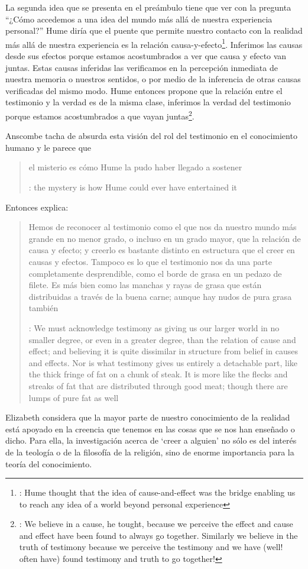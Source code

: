 La segunda idea que se presenta en el preámbulo tiene que ver con la pregunta \enquote{¿Cómo accedemos a una idea del mundo más allá de nuestra experiencia personal?} Hume diría que el puente que permite nuestro contacto con la realidad más allá de nuestra experiencia es la relación causa-y-efecto\footnote{\cite[Cf.~][3]{anscombe2008faith:tobelieve}: Hume thought that the idea of cause-and-effect was the bridge enabling us to reach any idea of a world beyond personal experience}. Inferimos las causas desde sus efectos porque estamos acostumbrados a ver que causa y efecto van juntas. Estas causas inferidas las verificamos en la percepción inmediata de nuestra memoria o nuestros sentidos, o por medio de la inferencia de otras causas verificadas del mismo modo\autocite[Cf.~][88]{anscombe1981parmenides:humeandjulius}. Hume entonces propone que la relación entre el testimonio y la verdad es de la misma clase, inferimos la verdad del testimonio porque estamos acostumbrados a que vayan juntas\footnote{\cite[Cf.~][3]{anscombe2008faith:tobelieve}: We believe in a cause, he tought, because we perceive the effect and cause and effect have been found to always go together. Similarly we believe in the truth of testimony because we perceive the testimony and we have (well! often have) found testimony and truth to go together!}.

Anscombe tacha de absurda esta visión del rol del testimonio en el conocimiento humano y le parece que \blockquote[{\cite[Cf.~][3]{anscombe2008faith:tobelieve}}: the mystery is how Hume could ever have entertained it]{el misterio es cómo Hume la pudo haber llegado a sostener}. Entonces explica: \blockquote[{\cite[3]{anscombe2008faith:tobelieve}}: We must acknowledge testimony as giving us our larger world in no smaller degree, or even in a greater degree, than the relation of cause and effect; and believing it is quite dissimilar in structure from belief in causes and effects. Nor is what testimony gives us entirely a detachable part, like the thick fringe of fat on a chunk of steak. It is more like the flecks and streaks of fat that are distributed through good meat; though there are lumps of pure fat as well]{Hemos de reconocer al testimonio como el que nos da nuestro mundo más grande en no menor grado, o incluso en un grado mayor, que la relación de causa y efecto; y creerlo es bastante distinto en estructura que el creer en causas y efectos. Tampoco es lo que el testimonio nos da una parte completamente desprendible, como el borde de grasa en un pedazo de filete. Es más bien como las manchas y rayas de grasa que están distribuidas a través de la buena carne; aunque hay nudos de pura grasa también} Elizabeth considera que la mayor parte de nuestro conocimiento de la realidad está apoyado en la creencia que tenemos en las cosas que se nos han enseñado o dicho. Para ella, la investigación acerca de `creer a alguien' no sólo es del interés de la teología o de la filosofía de la religión, sino de enorme importancia para la teoría del conocimiento.

